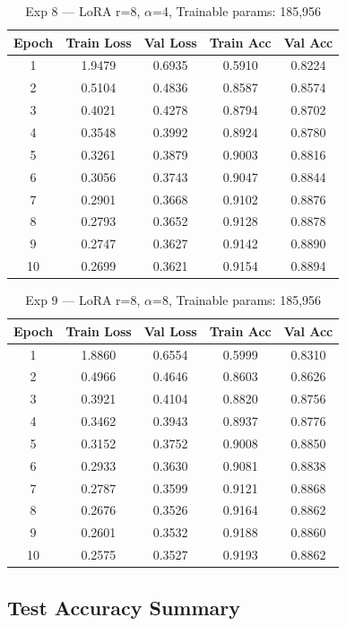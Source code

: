 \documentclass[12pt,a4paper]{article}
\begin{document}
\begin{table}[H]
\centering
\caption{Exp 8 — LoRA r=8, $\alpha$=4, Trainable params: 185,956}
\small
\begin{tabular}{ccccc}
\toprule
Epoch & Train Loss & Val Loss & Train Acc & Val Acc \\ \midrule
1  & 1.9479 & 0.6935 & 0.5910 & 0.8224 \\
2  & 0.5104 & 0.4836 & 0.8587 & 0.8574 \\
3  & 0.4021 & 0.4278 & 0.8794 & 0.8702 \\
4  & 0.3548 & 0.3992 & 0.8924 & 0.8780 \\
5  & 0.3261 & 0.3879 & 0.9003 & 0.8816 \\
6  & 0.3056 & 0.3743 & 0.9047 & 0.8844 \\
7  & 0.2901 & 0.3668 & 0.9102 & 0.8876 \\
8  & 0.2793 & 0.3652 & 0.9128 & 0.8878 \\
9  & 0.2747 & 0.3627 & 0.9142 & 0.8890 \\
10 & 0.2699 & 0.3621 & 0.9154 & 0.8894 \\
\bottomrule
\end{tabular}
\end{table}

\begin{table}[H]
\centering
\caption{Exp 9 — LoRA r=8, $\alpha$=8, Trainable params: 185,956}
\small
\begin{tabular}{ccccc}
\toprule
Epoch & Train Loss & Val Loss & Train Acc & Val Acc \\ \midrule
1  & 1.8860 & 0.6554 & 0.5999 & 0.8310 \\
2  & 0.4966 & 0.4646 & 0.8603 & 0.8626 \\
3  & 0.3921 & 0.4104 & 0.8820 & 0.8756 \\
4  & 0.3462 & 0.3943 & 0.8937 & 0.8776 \\
5  & 0.3152 & 0.3752 & 0.9008 & 0.8850 \\
6  & 0.2933 & 0.3630 & 0.9081 & 0.8838 \\
7  & 0.2787 & 0.3599 & 0.9121 & 0.8868 \\
8  & 0.2676 & 0.3526 & 0.9164 & 0.8862 \\
9  & 0.2601 & 0.3532 & 0.9188 & 0.8860 \\
10 & 0.2575 & 0.3527 & 0.9193 & 0.8862 \\
\bottomrule
\end{tabular}
\end{table}

\subsection{Test Accuracy Summary}
\end{document}

